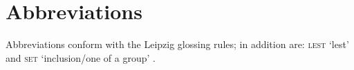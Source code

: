 \documentclass[output=paper,
modfonts
]{LSP/langsci}
\begin{document}
\section*{Abbreviations}
Abbreviations conform with the Leipzig glossing rules; in addition are: \textsc{lest} `lest' and \textsc{set}  `inclusion/one of a group' \citep{dixon1977a}.


\printbibliography[heading=subbibliography,notkeyword=this]

\end{document}
